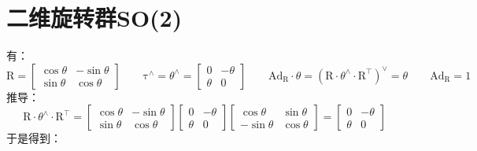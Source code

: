 \documentclass[12pt, onecolumn]{article}
\newcommand\normf{\fangsong}
\newcommand\liehat[1]{#1^{\land}}
\newcommand\lievee[1]{#1^\vee}
\newcommand\bsm[1]{\boldsymbol{\mathrm{#1}}}
\begin{document}
	\section{\normf 二维旋转群SO(2)}
	有：
	\begin{equation}
	\bsm{R}=\begin{bmatrix}
	\cos\theta&-\sin\theta\\
	\sin\theta&\cos\theta
	\end{bmatrix}
	\qquad
	\liehat{\bsm{\tau}}=\liehat{\theta}=\begin{bmatrix}
	0&-\theta\\
	\theta&0
	\end{bmatrix}
	\qquad
	\bsm{Ad}_{\bsm{R}}\cdot\theta=\lievee{\left(\bsm{R}\cdot\liehat{\theta}\cdot\bsm{R}^\top \right) }=\theta
	\qquad
	\bsm{Ad}_{\bsm{R}}=1
	\end{equation}
	推导：
	\begin{equation}
	\bsm{R}\cdot\liehat{\theta}\cdot\bsm{R}^\top =
	\begin{bmatrix}
		\cos\theta&-\sin\theta\\
		\sin\theta&\cos\theta
		\end{bmatrix}\begin{bmatrix}
			0&-\theta\\
			\theta&0
			\end{bmatrix}\begin{bmatrix}
					\cos\theta&\sin\theta\\
					-\sin\theta&\cos\theta
					\end{bmatrix}=\begin{bmatrix}
						0&-\theta\\
						\theta&0
						\end{bmatrix}
	\end{equation}
	于是得到：
\end{document}
